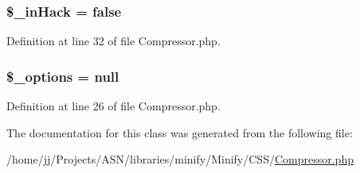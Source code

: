 \subsubsection[{\texorpdfstring{\$\+\_\+in\+Hack}{$_inHack}}]{\setlength{\rightskip}{0pt plus 5cm}\$\+\_\+in\+Hack = false\hspace{0.3cm}{\ttfamily [protected]}}\hypertarget{class_minify___c_s_s___compressor_a2ab85deb779cfccba3087bd0efa85ecb}{}\label{class_minify___c_s_s___compressor_a2ab85deb779cfccba3087bd0efa85ecb}


Definition at line 32 of file Compressor.\+php.

\subsubsection[{\texorpdfstring{\$\+\_\+options}{$_options}}]{\setlength{\rightskip}{0pt plus 5cm}\$\+\_\+options = null\hspace{0.3cm}{\ttfamily [protected]}}\hypertarget{class_minify___c_s_s___compressor_a1bebdc689c84eee59ad24c77e5531762}{}\label{class_minify___c_s_s___compressor_a1bebdc689c84eee59ad24c77e5531762}


Definition at line 26 of file Compressor.\+php.



The documentation for this class was generated from the following file\+:\begin{DoxyCompactItemize}
\item 
/home/jj/\+Projects/\+A\+S\+N/libraries/minify/\+Minify/\+C\+S\+S/\hyperlink{_compressor_8php}{Compressor.\+php}\end{DoxyCompactItemize}
